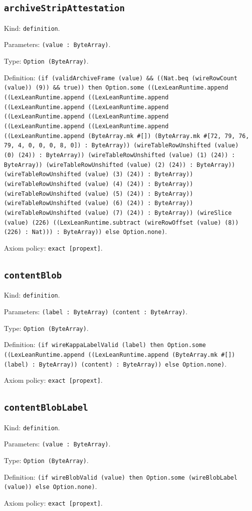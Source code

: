 \documentclass[11pt]{article}
\begin{document}
\subsection*{\texttt{archiveStripAttestation}}
\noindent Kind: \texttt{definition}.\par
\noindent Parameters: \texttt{(value : ByteArray)}.\par
\noindent Type: \texttt{Option (ByteArray)}.\par
\noindent Definition: \texttt{(if (validArchiveFrame (value) \&\& ((Nat.beq (wireRowCount (value)) (9)) \&\& true)) then Option.some ((LexLeanRuntime.append ((LexLeanRuntime.append ((LexLeanRuntime.append ((LexLeanRuntime.append ((LexLeanRuntime.append ((LexLeanRuntime.append ((LexLeanRuntime.append ((LexLeanRuntime.append ((LexLeanRuntime.append ((LexLeanRuntime.append (ByteArray.mk \#[]) (ByteArray.mk \#[72, 79, 76, 79, 4, 0, 0, 0, 8, 0]) : ByteArray)) (wireTableRowUnshifted (value) (0) (24)) : ByteArray)) (wireTableRowUnshifted (value) (1) (24)) : ByteArray)) (wireTableRowUnshifted (value) (2) (24)) : ByteArray)) (wireTableRowUnshifted (value) (3) (24)) : ByteArray)) (wireTableRowUnshifted (value) (4) (24)) : ByteArray)) (wireTableRowUnshifted (value) (5) (24)) : ByteArray)) (wireTableRowUnshifted (value) (6) (24)) : ByteArray)) (wireTableRowUnshifted (value) (7) (24)) : ByteArray)) (wireSlice (value) (226) ((LexLeanRuntime.subtract (wireRowOffset (value) (8)) (226) : Nat))) : ByteArray)) else Option.none)}.\par
\noindent Axiom policy: \texttt{exact [propext]}.\par
\subsection*{\texttt{contentBlob}}
\noindent Kind: \texttt{definition}.\par
\noindent Parameters: \texttt{(label : ByteArray) (content : ByteArray)}.\par
\noindent Type: \texttt{Option (ByteArray)}.\par
\noindent Definition: \texttt{(if wireKappaLabelValid (label) then Option.some ((LexLeanRuntime.append ((LexLeanRuntime.append (ByteArray.mk \#[]) (label) : ByteArray)) (content) : ByteArray)) else Option.none)}.\par
\noindent Axiom policy: \texttt{exact [propext]}.\par
\subsection*{\texttt{contentBlobLabel}}
\noindent Kind: \texttt{definition}.\par
\noindent Parameters: \texttt{(value : ByteArray)}.\par
\noindent Type: \texttt{Option (ByteArray)}.\par
\noindent Definition: \texttt{(if wireBlobValid (value) then Option.some (wireBlobLabel (value)) else Option.none)}.\par
\noindent Axiom policy: \texttt{exact [propext]}.\par
\end{document}
